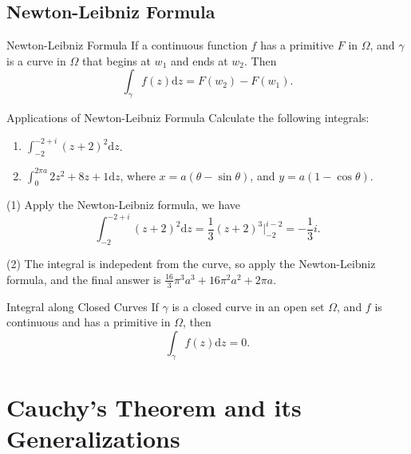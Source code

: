 \subsection{Newton-Leibniz Formula}

\begin{theorem}{Newton-Leibniz Formula}{}
  If a continuous function $f$ has a primitive $F$ in $\Omega$,
  and $\gamma$ is a curve in $\Omega$ that begins at $w_1$ and
  ends at $w_2$. Then
  \begin{equation}
    \int_{\gamma}f(z)\mathrm{d} z = F(w_2) - F(w_1).
  \end{equation}
\end{theorem}

\begin{example}{Applications of Newton-Leibniz Formula}{}
  Calculate the following integrals:
  \begin{enumerate}
  \item $\int_{-2}^{-2 + i} (z+2)^2 \mathrm{d} z$.
  \item $\int_0^{2\pi a} 2z^2 + 8z + 1 \mathrm{d} z$, where $x = a(\theta - \sin \theta)$,
    and $y = a (1 - \cos \theta)$.
  \end{enumerate}
\end{example}

\begin{solution}
  (1) Apply the Newton-Leibniz formula, we have
  \begin{equation}
    \int_{-2}^{-2+i} (z+2)^2 \mathrm{d} z = \frac{1}{3}(z+2)^3 \big|^{i-2}_{-2}
    = - \frac{1}{3}i.
  \end{equation}

  (2) The integral is indepedent from the curve, so apply the Newton-Leibniz formula,
  and the final answer is $\frac{16}{3}\pi^3a^3 + 16 \pi^2 a^2 + 2\pi a$.
\end{solution}

\begin{corollary}{Integral along Closed Curves}{}
  If $\gamma$ is a closed curve in an open set $\Omega$,
  and $f$ is continuous and has a primitive in $\Omega$, then
  \begin{equation}
    \int_{\gamma} f(z) \mathrm{d} z = 0.
  \end{equation}
\end{corollary}

\section{Cauchy's Theorem and its Generalizations}

